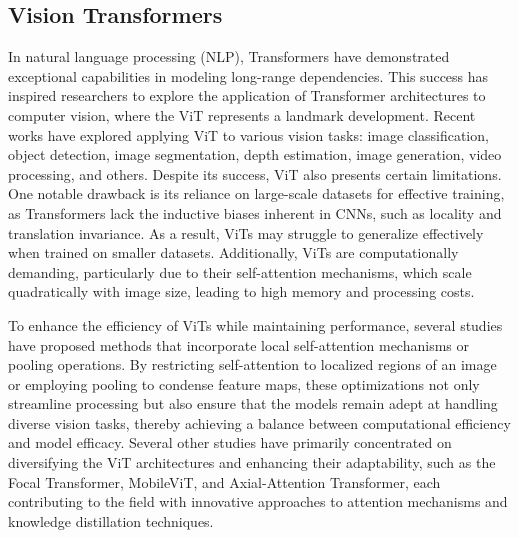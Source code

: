 \subsection{Vision Transformers}
In natural language processing (NLP), Transformers\cite{transformer} have demonstrated exceptional capabilities in modeling long-range dependencies. This success has inspired researchers to explore the application of Transformer architectures to computer vision, where the ViT represents a landmark development. Recent works have explored applying ViT to various vision tasks: image classification, object detection, image segmentation, depth estimation, image generation, video processing, and others. Despite its success, ViT also presents certain limitations. One notable drawback is its reliance on large-scale datasets for effective training, as Transformers lack the inductive biases inherent in CNNs, such as locality and translation invariance\cite{cvt}. As a result, ViTs may struggle to generalize effectively when trained on smaller datasets\cite{cct}. Additionally, ViTs are computationally demanding, particularly due to their self-attention mechanisms, which scale quadratically with image size, leading to high memory and processing costs. 

To enhance the efficiency of ViTs while maintaining performance, several studies\cite{swin,slide,cswin,p2t,pvtv2,metaformer} have proposed methods that incorporate local self-attention mechanisms or pooling operations. By restricting self-attention to localized regions of an image or employing pooling to condense feature maps, these optimizations not only streamline processing but also ensure that the models remain adept at handling diverse vision tasks, thereby achieving a balance between computational efficiency and model efficacy. Several other studies have primarily concentrated on diversifying the ViT architectures and enhancing their adaptability, such as the Focal Transformer\cite{focal}, MobileViT\cite{mobilevit}, and Axial-Attention Transformer\cite{valanarasu2021medical}, each contributing to the field with innovative approaches to attention mechanisms and knowledge distillation techniques.

